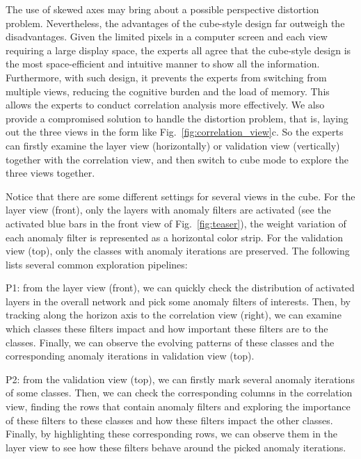 \documentclass[format=acmsmall, review=false, screen=true]{acmart}
\newcommand{\ti}{\textcolor[rgb]{0,0,0}}
\begin{document}
\ti{
The use of skewed axes may bring about a possible perspective distortion problem. Nevertheless, the advantages of the cube-style design far outweigh the disadvantages.
Given the limited pixels in a computer screen and each view requiring a large display space, the experts all agree that the cube-style design is the most space-efficient and intuitive manner to show all the information. Furthermore, with such design, it prevents the experts from switching from multiple views, reducing the cognitive burden and the load of memory.
This allows the experts to conduct correlation analysis more effectively.
We also provide a compromised solution to handle the distortion problem, that is, laying out the three views in the form like Fig.~\ref{fig:correlation_view}c. So the experts can firstly examine the layer view (horizontally) or validation view (vertically) together with the correlation view, and then switch to cube mode to explore the three views together.
}\ti{
Notice that there are some different settings for several views in the cube.
For the layer view (front), only the layers with anomaly filters are activated (see the activated blue bars in the front view of  Fig.~\ref{fig:teaser}), the weight variation of each anomaly filter is represented as a horizontal color strip.
For the validation view (top), only the classes with anomaly iterations are preserved.
The following lists several common exploration pipelines:
\begin{compactitem}
	\item P1: from the layer view (front), we can quickly check the distribution of activated layers in the overall network and pick some anomaly filters of interests. Then, by tracking along the horizon axis to the correlation view (right), we can examine which classes these filters impact and how important these filters are to the classes. Finally, we can observe the evolving patterns of these classes and the corresponding anomaly iterations in validation view (top).
	\item P2: from the validation view (top), we can firstly mark several anomaly iterations of some classes. Then, we can check the corresponding columns in the correlation view, finding the rows that contain anomaly filters and exploring the importance of these filters to these classes and how these filters impact the other classes. Finally, by highlighting these corresponding rows, we can observe them in the layer view to see how these filters behave around the picked anomaly iterations.

\end{compactitem}}
\end{document}
